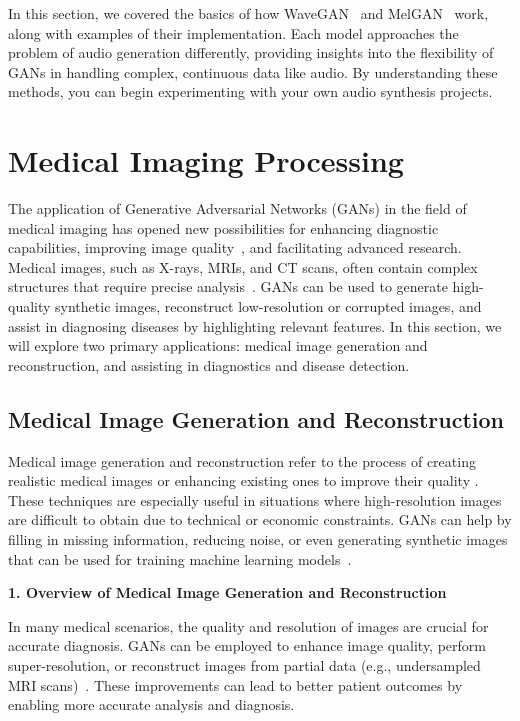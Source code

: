 In this section, we covered the basics of how WaveGAN~\cite{donahue2018adversarial} and MelGAN~\cite{kumar2019melgan} work, along with examples of their implementation. Each model approaches the problem of audio generation differently, providing insights into the flexibility of GANs in handling complex, continuous data like audio. By understanding these methods, you can begin experimenting with your own audio synthesis projects.


\section{Medical Imaging Processing}

The application of Generative Adversarial Networks (GANs) in the field of medical imaging has opened new possibilities for enhancing diagnostic capabilities, improving image quality~\cite{de2021survey}, and facilitating advanced research. Medical images, such as X-rays, MRIs, and CT scans, often contain complex structures that require precise analysis~\cite{razzak2018deep}. GANs can be used to generate high-quality synthetic images, reconstruct low-resolution or corrupted images, and assist in diagnosing diseases by highlighting relevant features. In this section, we will explore two primary applications: medical image generation and reconstruction, and assisting in diagnostics and disease detection.

\subsection{Medical Image Generation and Reconstruction}

Medical image generation and reconstruction refer to the process of creating realistic medical images or enhancing existing ones to improve their quality \cite{long2024pseudo}. These techniques are especially useful in situations where high-resolution images are difficult to obtain due to technical or economic constraints. GANs can help by filling in missing information, reducing noise, or even generating synthetic images that can be used for training machine learning models~\cite{razzak2018deep}.

\textbf{1. Overview of Medical Image Generation and Reconstruction}

In many medical scenarios, the quality and resolution of images are crucial for accurate diagnosis. GANs can be employed to enhance image quality, perform super-resolution, or reconstruct images from partial data (e.g., undersampled MRI scans)~\cite{scholl2011challenges}. These improvements can lead to better patient outcomes by enabling more accurate analysis and diagnosis.

